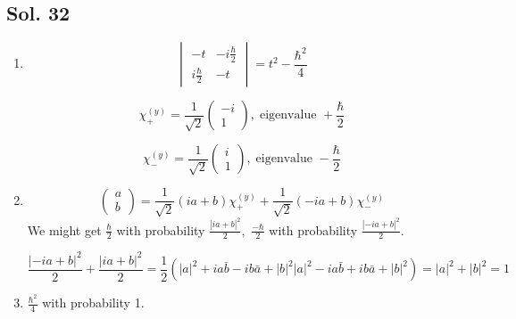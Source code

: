    \subsection*{Sol. 32}
   \begin{enumerate}
       \item 
       $$
       \begin{vmatrix}
       -t & -i\frac{\hbar}{2}\\
       i\frac{\hbar}{2} & -t
       \end{vmatrix}
       =
       t^2-\frac{\hbar^2}{4}
       $$

       $$
       \chi_+^{(y)}
       =
       \frac{1}{\sqrt{2}}
       \begin{pmatrix}
           -i\\1
       \end{pmatrix}
       ,\;
       \text{eigenvalue }
       +\frac{\hbar}{2}
       $$

       $$
       \chi_-^{(y)}
       =
       \frac{1}{\sqrt{2}}
       \begin{pmatrix}
           i\\1
       \end{pmatrix}
       ,\;
       \text{eigenvalue }
       -\frac{\hbar}{2}
       $$
    \item 
    $$
    \begin{pmatrix}
        a\\b
    \end{pmatrix}
    =
    \frac{1}{\sqrt{2}}
    (ia + b)
    \chi_+^{(y)}
    +\frac{1}{\sqrt{2}}
    (-ia+b)
    \chi_-^{(y)}
    $$
    We might get 
    $\frac{\hbar}{2}$ with probability 
    $\frac{|ia+b|^2}{2},$ 
    $\frac{-\hbar}{2}$ with probability 
    $\frac{|-ia+b|^2}{2}.$

    $$
    \frac{|-ia+b|^2}{2} + 
    \frac{|ia+b|^2}{2}
    =\frac{1}{2}
    (|a|^2 + ia\bar b -ib\bar a + |b|^2 
    |a|^2 - ia\bar b + ib\bar a + |b|^2 )
    =|a|^2 + |b|^2 = 1
    $$
    \item $\frac{\hbar^2}{4}$ with probability 1.
   \end{enumerate}

